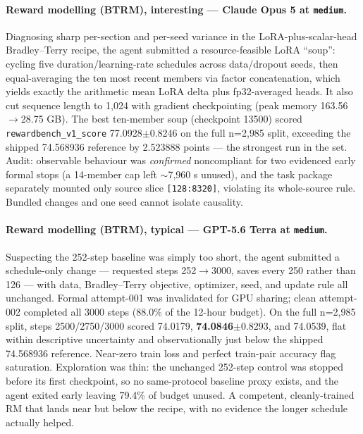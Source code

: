 \paragraph{Reward modelling (BTRM), interesting --- Claude Opus 5 at \texttt{medium}.} Diagnosing sharp per-section and per-seed variance in the LoRA-plus-scalar-head Bradley--Terry recipe, the agent submitted a resource-feasible LoRA ``soup'': cycling five duration/learning-rate schedules across data/dropout seeds, then equal-averaging the ten most recent members via factor concatenation, which yields exactly the arithmetic mean LoRA delta plus fp32-averaged heads. It also cut sequence length to 1{,}024 with gradient checkpointing (peak memory 163.56$\rightarrow$28.75 GB). The best ten-member soup (checkpoint 13500) scored \texttt{rewardbench\_v1\_score} 77.0928$\pm$0.8246 on the full n=2{,}985 split, exceeding the shipped 74.568936 reference by 2.523888 points --- the strongest run in the set. Audit: observable behaviour was \emph{confirmed} noncompliant for two evidenced early formal stops (a 14-member cap left $\sim$7{,}960 s unused), and the task package separately mounted only source slice \texttt{[128:8320]}, violating its whole-source rule. Bundled changes and one seed cannot isolate causality.

\paragraph{Reward modelling (BTRM), typical --- GPT-5.6 Terra at \texttt{medium}.} Suspecting the 252-step baseline was simply too short, the agent submitted a schedule-only change --- requested steps 252$\rightarrow$3000, saves every 250 rather than 126 --- with data, Bradley--Terry objective, optimizer, seed, and update rule all unchanged. Formal attempt-001 was invalidated for GPU sharing; clean attempt-002 completed all 3000 steps (88.0\% of the 12-hour budget). On the full n=2{,}985 split, steps 2500/2750/3000 scored 74.0179, \textbf{74.0846}$\pm$0.8293, and 74.0539, flat within descriptive uncertainty and observationally just below the shipped 74.568936 reference. Near-zero train loss and perfect train-pair accuracy flag saturation. Exploration was thin: the unchanged 252-step control was stopped before its first checkpoint, so no same-protocol baseline proxy exists, and the agent exited early leaving 79.4\% of budget unused. A competent, cleanly-trained RM that lands near but below the recipe, with no evidence the longer schedule actually helped.

